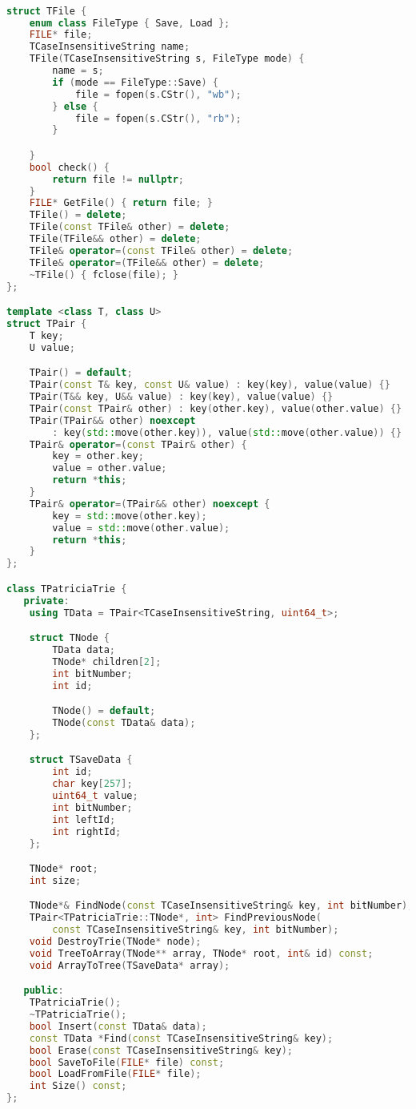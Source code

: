 \begin{lstlisting}[language=C++]

struct TFile {
    enum class FileType { Save, Load };
    FILE* file;
    TCaseInsensitiveString name;
    TFile(TCaseInsensitiveString s, FileType mode) {
        name = s;
        if (mode == FileType::Save) {
            file = fopen(s.CStr(), "wb");
        } else {
            file = fopen(s.CStr(), "rb");
        }

    }
    bool check() {
        return file != nullptr;
    }
    FILE* GetFile() { return file; }
    TFile() = delete;
    TFile(const TFile& other) = delete;
    TFile(TFile&& other) = delete;
    TFile& operator=(const TFile& other) = delete;
    TFile& operator=(TFile&& other) = delete;
    ~TFile() { fclose(file); }
};

template <class T, class U>
struct TPair {
    T key;
    U value;

    TPair() = default;
    TPair(const T& key, const U& value) : key(key), value(value) {}
    TPair(T&& key, U&& value) : key(key), value(value) {}
    TPair(const TPair& other) : key(other.key), value(other.value) {}
    TPair(TPair&& other) noexcept
        : key(std::move(other.key)), value(std::move(other.value)) {}
    TPair& operator=(const TPair& other) {
        key = other.key;
        value = other.value;
        return *this;
    }
    TPair& operator=(TPair&& other) noexcept {
        key = std::move(other.key);
        value = std::move(other.value);
        return *this;
    }
};

class TPatriciaTrie {
   private:
    using TData = TPair<TCaseInsensitiveString, uint64_t>;

    struct TNode {
        TData data;
        TNode* children[2];
        int bitNumber;
        int id;

        TNode() = default;
        TNode(const TData& data);
    };

    struct TSaveData {
        int id;
        char key[257];
        uint64_t value;
        int bitNumber;
        int leftId;
        int rightId;
    };

    TNode* root;
    int size;

    TNode*& FindNode(const TCaseInsensitiveString& key, int bitNumber);
    TPair<TPatriciaTrie::TNode*, int> FindPreviousNode(
        const TCaseInsensitiveString& key, int bitNumber);
    void DestroyTrie(TNode* node);
    void TreeToArray(TNode** array, TNode* root, int& id) const;
    void ArrayToTree(TSaveData* array);

   public:
    TPatriciaTrie();
    ~TPatriciaTrie();
    bool Insert(const TData& data);
    const TData *Find(const TCaseInsensitiveString& key);
    bool Erase(const TCaseInsensitiveString& key);
    bool SaveToFile(FILE* file) const;
    bool LoadFromFile(FILE* file);
    int Size() const;
};
\end{lstlisting}
\pagebreak

